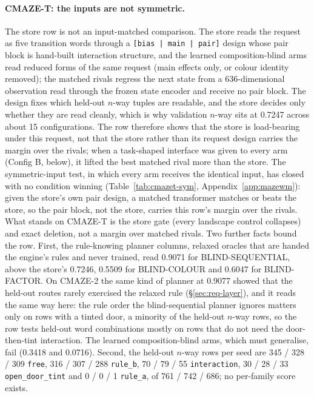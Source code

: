 \documentclass{article} %
\begin{document}
\paragraph{CMAZE-T: the inputs are not symmetric.} The store row is not an input-matched
comparison. The store reads the request as five transition words through a \texttt{[bias | main |
pair]} design whose pair block is hand-built interaction structure, and the learned composition-blind
arms read reduced forms of the same request (main effects only, or colour identity removed); the
matched rivals regress the next state from a 636-dimensional observation read through the frozen
state encoder and receive no pair block. The design fixes which held-out $n$-way tuples are
readable, and the store decides only whether they are read cleanly, which is why validation $n$-way
sits at 0.7247 across about 15 configurations. The row therefore shows that the store is
load-bearing under this request, not that the store rather than its request design carries the
margin over the rivals; when a task-shaped interface was given to every arm (Config B, below), it
lifted the best matched rival more than the store. The symmetric-input test, in which every arm
receives the identical input, has closed with no condition winning (Table~\ref{tab:cmazet-sym},
Appendix~\ref{app:mazewm}): given the store's own pair design, a matched transformer matches or
beats the store, so the pair block, not the store, carries this row's margin over the rivals. %
What stands on CMAZE-T is the store gate (every landscape control collapses) and exact deletion,
not a margin over matched rivals.
Two further facts bound the row. First, the rule-knowing planner columns, relaxed oracles that are
handed the engine's rules and never trained, read 0.9071 for BLIND-SEQUENTIAL, above the store's
0.7246, 0.5509 for BLIND-COLOUR and 0.6047 for BLIND-FACTOR. On CMAZE-2 the same kind of planner at
0.9077 showed that the held-out routes rarely exercised the relaxed rule (\S\ref{sec:req-layer}), and
it reads the same way here: the rule order the blind-sequential planner ignores matters only on rows
with a tinted door, a minority of the held-out $n$-way rows, so the row tests held-out word
combinations mostly on rows that do not need the door-then-tint interaction. The learned
composition-blind arms, which must generalise, fail (0.3418 and 0.0716). Second, the held-out
$n$-way rows per seed are 345 / 328 / 309 \texttt{free}, 316 / 307 / 288 \texttt{rule\_b}, 70 / 79 /
55 \texttt{interaction}, 30 / 28 / 33 \texttt{open\_door\_tint} and 0 / 0 / 1 \texttt{rule\_a}, of 761
/ 742 / 686; no per-family score exists.
\end{document}
